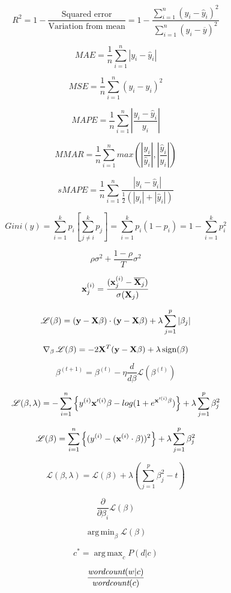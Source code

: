 \documentclass[11pt]{article}
\DeclareMathOperator*{\argmax}{arg\,max}
\DeclareMathOperator*{\argmin}{arg\,min}
\begin{document}
\[
R^2 = 1 - \frac{\text{Squared error}}{\text{Variation from mean}} = 1 - \frac{\sum_{i=1}^{n} (y_i - \hat{y}_i)^2}{\sum_{i=1}^{n} (y_i - \overline{y})^2}
\]

\[
MAE = \frac{1}{n} \sum_{i=1}^{n} |y_i - \hat{y}_i|
\]

\[
MSE = \frac{1}{n} \sum_{i=1}^{n} \left(y_i - \hat{y}_i\right)^2
\]

\[
MAPE = \frac{1}{n} \sum_{i=1}^{n} \left|\frac{y_i - \hat{y}_i}{y_i}\right|
\]


\[
MMAR = \frac{1}{n} \sum_{i=1}^{n} max(\left|\frac{y_i}{\hat{y}_i}\right|,\left|\frac{\hat{y}_i}{y_i}\right|)
\]

\[
sMAPE = \frac{1}{n} \sum_{i=1}^{n} \frac{|y_i - \hat{y}_i|}{\frac{1}{2}(|y_i|+|\hat{y}_i|)}
\]

$$
Gini(y) = \sum_{i=1}^{k} p_i \left[ \sum_{j \ne i}^k p_j \right] = \sum_{i=1}^{k} p_i (1 - p_i) = 1 - \sum_{i=1}^{k} p_i^2
$$

$$
\rho \sigma^2  + \frac{1-\rho}{T}\sigma^2
$$

$$
{\bf x}_j^{(i)} = \frac{({\bf x}_j^{(i)} - \overline{{\bf X}_j})}{\sigma({\bf X}_j)}
$$

$$
{\mathscr L}(\beta) = ({\bf y} - {\bf X} \beta) \cdot ({\bf y} - {\bf X} \beta) + \lambda \sum_{j=1}^{p}|\beta_j|
$$

$$
\nabla_{\beta}\, {\mathscr L}(\beta) = -2{\bf X}^T ({\bf y} - {\bf X} \beta) + \lambda \,\text{sign}(\beta)
$$


$$
\beta^{(t+1)} = \beta^{(t)} - \eta \frac{d}{d \beta} {\mathscr L}(\beta^{(t)})
$$

$$
{\mathscr L}(\beta,\lambda) = - \sum_{i=1}^n \left \{ y^{(i)}{\bf x}'^{(i)}\beta - log(1+e^{{\bf x}'^{(i)}\beta}) \right \} + \lambda \sum_{j=1}^{p}  \beta_j^2
$$


$$
{\mathscr L}(\beta) =  \sum_{i=1}^n \left \{ (y^{(i)} - ({\bf x}^{(i)} \cdot \beta))^2 \right \} + \lambda \sum_{j=1}^{p}  \beta_j^2
$$

$$
{\mathscr L}(\beta, \lambda) = {\mathscr L}(\beta) + \lambda (\sum_{j=1}^{p}  \beta_j^2 - t)
$$

$$
\frac{\partial}{\partial \beta_i} {\mathscr L}(\beta)
$$

$$
\argmin_{\beta} {\mathscr L}(\beta)
$$

$$
c^* = \argmax_{c}  P(d|c)
$$

$$
\frac{\text{\it wordcount}(w|c)}{\text{\it wordcount}(c)}
$$
 
\end{document}
